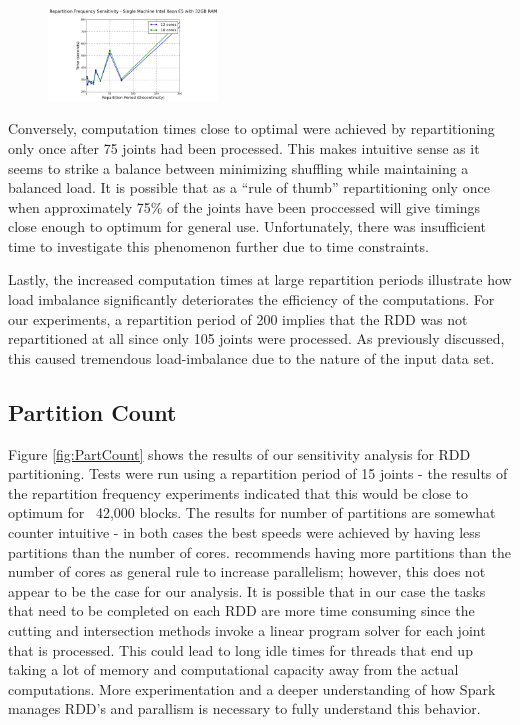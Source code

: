 \begin{figure}
  \centering
  \includegraphics[width=0.4\textwidth]{FrequencySensitivity}
  \caption{}
  \label{fig:FrequencySensitivity}
\end{figure}

Conversely, computation times close to optimal were achieved by repartitioning only once after 75 joints had been processed. This makes intuitive sense as it seems to strike a balance between minimizing shuffling  while  maintaining a balanced load. It is possible that as a ``rule of thumb'' repartitioning only once when approximately 75\% of the joints have been proccessed will give timings close enough to optimum for general use. Unfortunately, there was insufficient time to investigate this phenomenon further due to time constraints. \par

Lastly, the increased computation times at large repartition periods illustrate how load imbalance significantly deteriorates the efficiency of the computations. For our experiments, a repartition period of 200 implies that the RDD was not repartitioned at all since only 105 joints were processed. As previously discussed, this caused tremendous load-imbalance due to the nature of the input data set. \par

\subsection{Partition Count}
Figure \ref{fig:PartCount} shows the results of our sensitivity analysis for RDD partitioning. Tests were run using a repartition period of 15 joints - the results of the repartition frequency experiments indicated that this would be close to optimum for ~42,000 blocks. The results for number of partitions are somewhat counter intuitive - in both cases the best speeds were achieved by having less partitions than the number of cores. \cite{sparkTuning} recommends having more partitions than the number of cores as general rule to increase parallelism; however, this does not appear to be the case for our analysis. It is possible that in our case the tasks that need to be completed on each RDD are more time consuming since the cutting and intersection methods invoke a linear program solver for each joint that is processed. This could lead to long idle times for threads that end up taking a lot of memory and computational capacity away from the actual computations. More experimentation and a deeper understanding of how Spark manages RDD's and parallism is necessary to fully understand this behavior. \par

